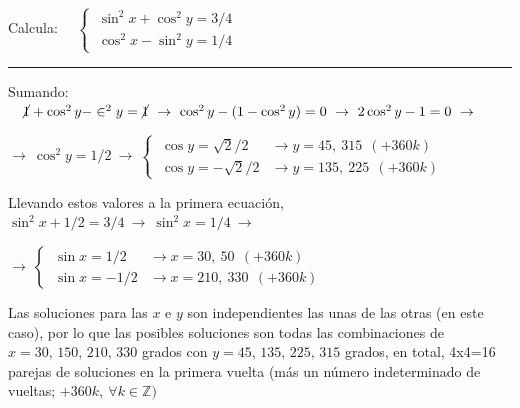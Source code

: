 \begin{miejercicio}

Calcula: $\quad \begin{cases} \ \sin^2 x + \cos^2 y= 3/4 \\ \ \cos^2 x -\sin^2 y= 1/4 \end{cases}$

\rule{250pt}{0.1pt}

\vspace{4mm} Sumando: $\quad \cancel{1} +\cos^2y-\in^2y=\cancel {1} \ \to \ \cos^2 y-(1-\cos^2 y)=0 \ \to \ 2\cos^2 y-1=0 \ \to $

\vspace{2mm} $\to \ \cos^2 y=1/2 \ \to \ \begin{cases} 	\ \cos y =\sqrt{2}/2 &\to  y=45,\ 315\ \ (+360 k) \\ 	\ \cos y =-\sqrt{2}/2 &\to  y=135,\ 225\ \ (+360 k) \end{cases}$

\vspace{2mm} Llevando estos valores a la primera ecuación, $\sin^2 x+1/2=3/4 \ \to \ \sin^2 x=1/4 \ \to $

\vspace{2mm} $\to \ \begin{cases}
 \ \sin x =1/2 &\to x=30,\ 50 \ \ (+360k) \\  \ \sin x =-1/2 &\to x=210,\ 330 \ \ (+360k)
 \end{cases}$
 
 \vspace{2mm} Las soluciones para las $x$ e $y$ son independientes las unas de las otras (en este caso), por lo que las posibles soluciones son todas las combinaciones de $x=30, \, 150,\, 210,\, 330$ grados  con $y=45, \, 135,\, 225,\, 315$ grados, en total, 4x4=16 parejas de soluciones en la primera vuelta (más un número indeterminado de vueltas; $+360 k,\ \forall k \in \mathbb Z)\ $

\end{miejercicio}


